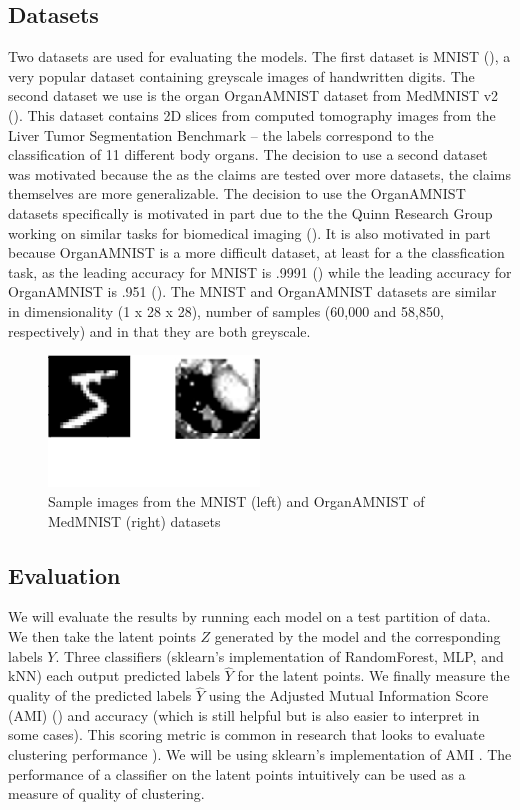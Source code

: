\documentclass[./dissertation.tex]{subfiles}
\begin{document}
    \subsection{Datasets}
    Two datasets are used for evaluating the models. The first dataset is MNIST (\cite{lecun-mnisthandwrittendigit-2010}), a very popular dataset containing greyscale images of handwritten digits. The second dataset we use is the organ OrganAMNIST dataset from MedMNIST v2 (\cite{medmnistv2}). This dataset contains 2D slices from computed tomography images from the Liver Tumor Segmentation Benchmark -- the labels correspond to the classification of 11 different body organs. The decision to use a second dataset was motivated because the as the claims are tested over more datasets, the claims themselves are more generalizable. The decision to use the OrganAMNIST datasets specifically is motivated in part due to the the Quinn Research Group working on similar tasks for biomedical imaging (\cite{Zain2020TowardsAU}). It is also motivated in part because OrganAMNIST is a more difficult dataset, at least for a the classfication task, as the leading accuracy for MNIST is .9991 (\cite{DBLP:journals/corr/abs-2008-10400}) while the leading accuracy for OrganAMNIST is .951 (\cite{medmnistv2}). The MNIST and OrganAMNIST datasets are similar in dimensionality (1 x 28 x 28), number of samples (60,000 and 58,850, respectively) and in that they are both greyscale.
    
    \begin{figure}[h]
        \centering\includegraphics[width=0.5\textwidth]{figures/cropped_datasets.png}
        \caption{Sample images from the MNIST (left) and OrganAMNIST of MedMNIST (right) datasets}
        \label{Datasets Diagram}
    \end{figure}
    
    \subsection{Evaluation}
    We will evaluate the results by running each model on a test partition of data. We then take the latent points $Z$ generated by the model and the corresponding labels $Y$. Three classifiers (sklearn's implementation of RandomForest, MLP, and kNN) each output predicted labels $\hat{Y}$ for the latent points. We finally measure the quality of the predicted labels $\hat{Y}$ using the Adjusted Mutual Information Score (AMI) (\cite{vinh2010information}) and accuracy (which is still helpful but is also easier to interpret in some cases). This scoring metric is common in research that looks to evaluate clustering performance \cite{zhu2021finding} \cite{emmons2016analysis}). We will be using sklearn's implementation of AMI \cite{scikit-learn}. The performance of a classifier on the latent points intuitively can be used as a measure of quality of clustering.
\end{document}
